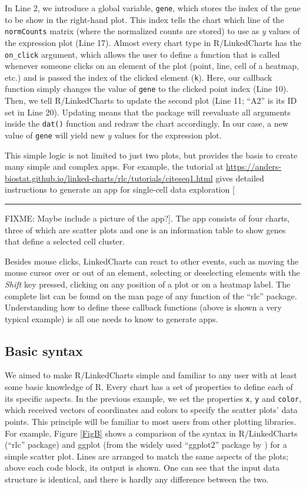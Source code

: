 \documentclass[twocolumn,10pt]{article}
\newcommand{\blockade}{\rule{3em}{0.7em}}  %
\newcommand{\fixme}[1]{[ \blockade FIXME: #1]}
\begin{document}
In Line 2, we introduce a global variable, \texttt{gene}, which stores the index of the gene to be show in the right-hand plot. This index tells the chart which line of the \texttt{normCounts} matrix (where the normalized counts are stored) to use as \emph{y} values of the expression plot (Line 17). Almost every chart type in R/LinkedCharts has the \texttt{on_click} argument, which allows the user to define a function that is called whenever someone clicks on an element of the plot (point, line, cell of a heatmap, etc.) and is passed the index of the clicked element (\texttt{k}).  Here, our callback function simply changes the value of \texttt{gene} to the clicked point index (Line 10). Then, we tell R/LinkedCharts to update the second plot (Line 11; ``A2'' is its ID set in Line 20). Updating means that the package will reevaluate all arguments inside the \texttt{dat()} function and redraw the chart accordingly. In our case, a new value of \texttt{gene} will yield new \emph{y} values for the expression plot.

This simple logic is not limited to just two plots, but provides the basis to create many simple and complex apps. For example, the tutorial at \url{https://anders-biostat.github.io/linked-charts/rlc/tutorials/citeseq1.html} gives detailed instructions to generate an app for single-cell data exploration \fixme{Maybe include a picture of the app?}. The app consists of four charts, three of which are scatter plots and one is an information table to show genes that define a selected cell cluster.

Besides mouse clicks, LinkedCharts can react to other events, such as moving the mouse cursor over or out of an element, selecting or deselecting elements with the \emph{Shift} key pressed, clicking on any position of a plot or on a heatmap label. The complete list can be found on the man page of any function of the ``rlc'' package. Understanding how to define these callback functions (above is shown a very typical example) is all one needs to know to generate apps. 

\subsection{Basic syntax}

We aimed to make R/LinkedCharts simple and familiar to any user with at least some basic knowledge of R. Every chart has a set of properties to define each of its specific aspects. In the previous example, we set the properties \texttt{x}, \texttt{y} and \texttt{color}, which received vectors of coordinates and colors to specify the scatter plots' data points. This principle will be familiar to most users from other plotting libraries. For example, Figure \ref{FigB} shows a comparison of the syntax in R/LinkedCharts (``rlc'' package) and ggplot (from the widely used ``ggplot2'' package by \citet{wickham_2016}) for a simple scatter plot. Lines are arranged to match the same aspects of the plots; above each code block, its output is shown. One can see that the input data structure is identical, and there is hardly any difference between the two.
\end{document}
